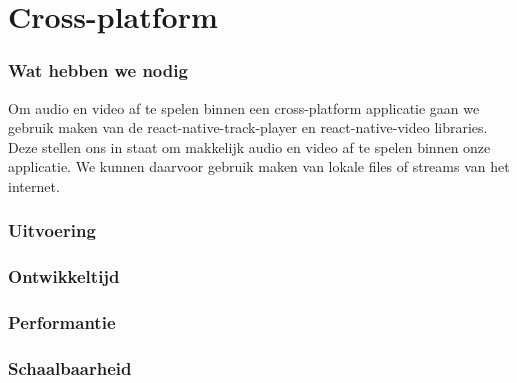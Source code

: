 \section{Cross-platform}
\subsubsection{Wat hebben we nodig}
Om audio en video af te spelen binnen een cross-platform applicatie gaan we gebruik maken van de
react-native-track-player en react-native-video libraries. Deze stellen ons in staat om makkelijk 
audio en video af te spelen binnen onze applicatie. We kunnen daarvoor gebruik maken van lokale files
of streams van het internet.

\subsubsection{Uitvoering}



\subsubsection{Ontwikkeltijd}



\subsubsection{Performantie}



\subsubsection{Schaalbaarheid}




